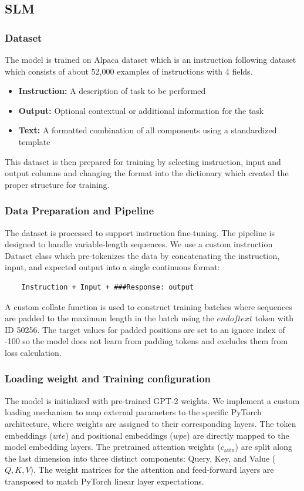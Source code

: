 \subsection{SLM}
\subsubsection{Dataset}
The model is trained on Alpaca dataset \cite{alpaca} which is an instruction following dataset which consists of about 52,000 examples of instructions with 4 fields.
\begin{itemize}
	\item \textbf{Instruction: }
	A description of task to be performed
	\item \textbf{Output: }
	Optional contextual or additional information for the task
	\item \textbf{Text: }
	A formatted combination of all components using a standardized template 
\end{itemize} 
This dataset is then prepared for training by selecting instruction, input and output columns and changing the format into the dictionary which created the proper structure for training. 

\subsubsection{Data Preparation and Pipeline}
The dataset is processed to support instruction fine-tuning. The pipeline is designed to handle variable-length sequences. We use a custom instruction Dataset class which pre-tokenizes the data by concatenating the instruction, input, and expected output into a single continuous format:

\begin{verbatim}
	Instruction + Input + ###Response: output
\end{verbatim}

A custom collate function is used to construct training batches where sequences are padded to the maximum length in the batch using the $endoftext$ token with ID 50256. The target values for padded positions are set to an ignore index of -100 so the model does not learn from padding tokens and excludes them from loss calculation. 

\subsubsection{Loading weight and Training configuration}
The model is initialized with pre-trained GPT-2 weights. We implement a custom loading mechanism to map external parameters to the specific PyTorch architecture, where weights are assigned to their corresponding layers. The token embeddings ($wte$) and positional embeddings ($wpe$) are directly mapped to the model embedding layers. The pretrained attention weights ($c_{\text{attn}}$) are split along the last dimension into three distinct components: Query, Key, and Value ($Q, K, V$). The weight matrices for the attention and feed-forward layers are transposed to match PyTorch linear layer expectations.

